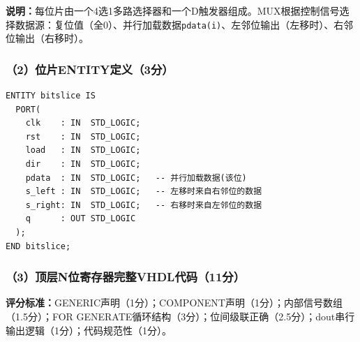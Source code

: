 \textbf{说明：}每位片由一个4选1多路选择器和一个D触发器组成。MUX根据控制信号选择数据源：复位值（全0）、并行加载数据\texttt{pdata(i)}、左邻位输出（左移时）、右邻位输出（右移时）。

\subsubsection{（2）位片ENTITY定义（3分）}

\begin{lstlisting}[language=VDL]
ENTITY bitslice IS
  PORT(
    clk    : IN  STD_LOGIC;
    rst    : IN  STD_LOGIC;
    load   : IN  STD_LOGIC;
    dir    : IN  STD_LOGIC;
    pdata  : IN  STD_LOGIC;   -- 并行加载数据(该位)
    s_left : IN  STD_LOGIC;   -- 左移时来自右邻位的数据
    s_right: IN  STD_LOGIC;   -- 右移时来自左邻位的数据
    q      : OUT STD_LOGIC
  );
END bitslice;
\end{lstlisting}

\subsubsection{（3）顶层N位寄存器完整VHDL代码（11分）}

\begin{framed}
\textbf{评分标准：}GENERIC声明（1分）；COMPONENT声明（1分）；内部信号数组（1.5分）；FOR GENERATE循环结构（3分）；位间级联正确（2.5分）；dout串行输出逻辑（1分）；代码规范性（1分）。
\end{framed}

